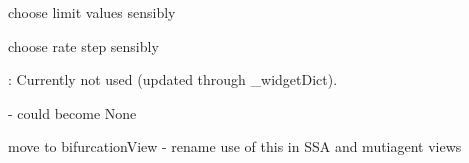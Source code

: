 \begin{DoxyRefList}
choose limit values sensibly 

choose rate step sensibly  
\item[\label{todo__todo000047}%
\Hypertarget{todo__todo000047}%
Global \hyperlink{class_mu_mo_t_1_1_mu_mo_t_s_s_a_view_a5feff4ca83ee97d6e09874496a4975d4}{Mu\+Mo\+T\+S\+S\+A\+View.\+\_\+plot\+Type} ]\+: Currently not used (updated through \+\_\+widget\+Dict). 
\item[\label{todo__todo000022}%
\Hypertarget{todo__todo000022}%
Global \hyperlink{class_mu_mo_t_1_1_mu_mo_tview_a15f56ca9811d1e67d721fa64f9b0dc1e}{Mu\+Mo\+Tview.\+\_\+controller} ]-\/ could become None  
\item[\label{todo__todo000023}%
\Hypertarget{todo__todo000023}%
Global \hyperlink{class_mu_mo_t_1_1_mu_mo_tview_a5feff4ca83ee97d6e09874496a4975d4}{Mu\+Mo\+Tview.\+\_\+plot\+Type} ]move to bifurcation\+View -\/ rename use of this in S\+SA and mutiagent views 
\end{DoxyRefList}